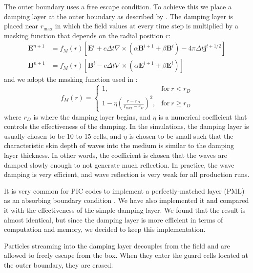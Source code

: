 The outer boundary uses a free escape condition. To achieve this we place a
damping layer at the outer boundary as described by \citet{umeda_improved_2001}.
The damping layer is placed near $r_\mathrm{max}$ in which the field values at
every time step is multiplied by a masking function that depends on the radial
position $r$:
\begin{align}
  \mathbf{E}^{n+1} &= f_M(r) \left[ \mathbf{E}^i + c\Delta t\nabla \times \left( \alpha
                     \mathbf{B}^{i+1} + \beta \mathbf{B}^i \right) - 4\pi
                     \Delta t\mathbf{j}^{i+1/2} \right] \\
  \mathbf{B}^{n+1} &= f_{M}(r) \left[ \mathbf{B}^i - c\Delta t\nabla \times \left(
                     \alpha \mathbf{E}^{i+1} + \beta \mathbf{E}^i \right) \right]
\end{align}
and we adopt the masking function used in \citep{umeda_improved_2001}:
\begin{equation}
  \label{eq:masking-function}
  f_M(r) =
  \begin{cases}
    \displaystyle 1, & \mathrm{for\ }r < r_D \\
    \displaystyle 1 - \eta\left( \frac{r - r_D}{r_\mathrm{max} - r_D} \right)^2, & \mathrm{for\ }r \geq r_{D}
  \end{cases}
\end{equation}
where $r_{D}$ is where the damping layer begins, and $\eta$ is a numerical
coefficient that controls the effectiveness of the damping. In the simulations,
the damping layer is usually chosen to be 10 to 15 cells, and $\eta$ is chosen
to be small such that the characteristic skin depth of waves into the medium is
similar to the damping layer thickness. In other words, the coefficient is
chosen that the waves are damped slowly enough to not generate much reflection.
In practice, the wave damping is very efficient, and wave reflection is very
weak for all production runs.

It is very common for PIC codes to implement a perfectly-matched layer (PML) as
an absorbing boundary condition \citep{berenger_perfectly_1994}. We have also
implemented it and compared it with the effectiveness of the simple damping
layer. We found that the result is almost identical, but since the damping layer
is more efficient in terms of computation and memory, we decided to keep this
implementation.

Particles streaming into the damping layer decouples from the field and are
allowed to freely escape from the box. When they enter the guard cells located at
the outer boundary, they are erased.



